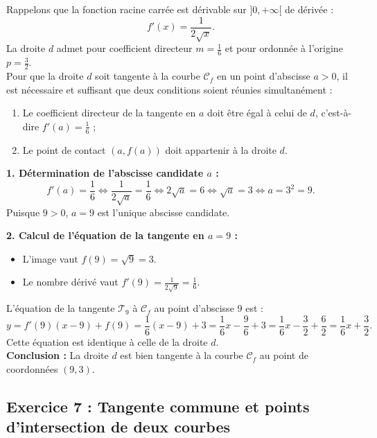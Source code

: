 \documentclass[11pt,a4paper]{article}
\begin{document}
\begin{correctionbox}
Rappelons que la fonction racine carrée est dérivable sur $]0, +\infty[$ de dérivée :
\[
f'(x) = \frac{1}{2\sqrt{x}}.
\]
La droite $d$ admet pour coefficient directeur $m = \frac{1}{6}$ et pour ordonnée à l'origine $p = \frac{3}{2}$.\\
Pour que la droite $d$ soit tangente à la courbe $\mathcal{C}_f$ en un point d'abscisse $a > 0$, il est nécessaire et suffisant que deux conditions soient réunies simultanément :
\begin{enumerate}[label=(\alph*)]
    \item Le coefficient directeur de la tangente en $a$ doit être égal à celui de $d$, c'est-à-dire $f'(a) = \frac{1}{6}$ ;
    \item Le point de contact $(a, f(a))$ doit appartenir à la droite $d$.
\end{enumerate}

\textbf{1. Détermination de l'abscisse candidate $a$ :}
\[
f'(a) = \frac{1}{6} \iff \frac{1}{2\sqrt{a}} = \frac{1}{6} \iff 2\sqrt{a} = 6 \iff \sqrt{a} = 3 \iff a = 3^2 = 9.
\]
Puisque $9 > 0$, $a = 9$ est l'unique abscisse candidate.

\textbf{2. Calcul de l'équation de la tangente en $a = 9$ :}
\begin{itemize}
    \item L'image vaut $f(9) = \sqrt{9} = 3$.
    \item Le nombre dérivé vaut $f'(9) = \frac{1}{2\sqrt{9}} = \frac{1}{6}$.
\end{itemize}
L'équation de la tangente $\mathcal{T}_9$ à $\mathcal{C}_f$ au point d'abscisse $9$ est :
\[
y = f'(9)(x - 9) + f(9) = \frac{1}{6}(x - 9) + 3 = \frac{1}{6}x - \frac{9}{6} + 3 = \frac{1}{6}x - \frac{3}{2} + \frac{6}{2} = \frac{1}{6}x + \frac{3}{2}.
\]
Cette équation est identique à celle de la droite $d$.\\
\textbf{Conclusion :} La droite $d$ est bien tangente à la courbe $\mathcal{C}_f$ au point de coordonnées $(9, 3)$.
\end{correctionbox}

\subsection*{Exercice 7 : Tangente commune et points d'intersection de deux courbes}
\end{document}
